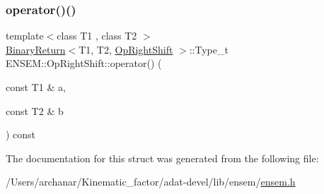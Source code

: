 \subsubsection{\texorpdfstring{operator()()}{operator()()}\hspace{0.1cm}{\footnotesize\ttfamily [3/3]}}
{\footnotesize\ttfamily template$<$class T1 , class T2 $>$ \\
\mbox{\hyperlink{structENSEM_1_1BinaryReturn}{Binary\+Return}}$<$T1, T2, \mbox{\hyperlink{structENSEM_1_1OpRightShift}{Op\+Right\+Shift}} $>$\+::Type\+\_\+t E\+N\+S\+E\+M\+::\+Op\+Right\+Shift\+::operator() (\begin{DoxyParamCaption}\item[{const T1 \&}]{a,  }\item[{const T2 \&}]{b }\end{DoxyParamCaption}) const\hspace{0.3cm}{\ttfamily [inline]}}



The documentation for this struct was generated from the following file\+:\begin{DoxyCompactItemize}
\item 
/\+Users/archanar/\+Kinematic\+\_\+factor/adat-\/devel/lib/ensem/\mbox{\hyperlink{adat-devel_2lib_2ensem_2ensem_8h}{ensem.\+h}}\end{DoxyCompactItemize}
